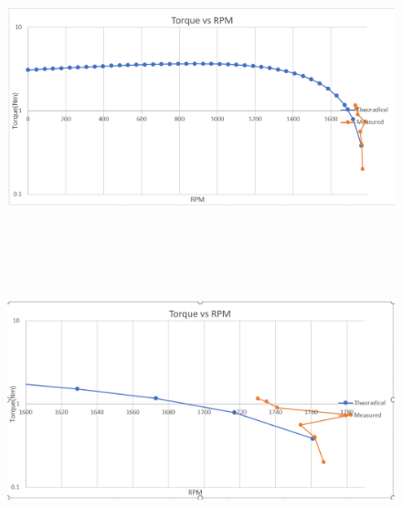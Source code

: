 \documentclass{article}
\begin{document}
    \begin{figure}[H]
        \centering
        \includegraphics[width=12cm, height = 8cm]{figures/rpm_torque.PNG}
        \label{fig:rpm_torque}
    \end{figure}

    \begin{figure}[H]
        \centering
        \includegraphics[width=12cm, height = 8cm]{figures/rpm_torque_zoom_in.PNG}
        \label{fig:rpm_torque_zin}
    \end{figure}

   
    



    
    

            
        


        
\end{document}
